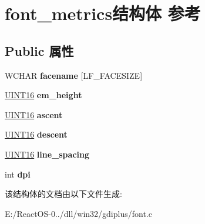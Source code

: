 \hypertarget{structfont__metrics}{}\section{font\+\_\+metrics结构体 参考}
\label{structfont__metrics}
\subsection*{Public 属性}
\begin{DoxyCompactItemize}
\item 
\mbox{\label{structfont__metrics_abbb6db4876b4f1fd09c288479f6adfc1}} 
W\+C\+H\+AR {\bfseries facename} \mbox{[}L\+F\+\_\+\+F\+A\+C\+E\+S\+I\+ZE\mbox{]}
\item 
\mbox{\label{structfont__metrics_a4f29cfd5a0ff6f2d4a1b8b5e36f22c2e}} 
\hyperlink{_processor_bind_8h_a09f1a1fb2293e33483cc8d44aefb1eb1}{U\+I\+N\+T16} {\bfseries em\+\_\+height}
\item 
\mbox{\label{structfont__metrics_a5e860c924043866358747543e44a4b1f}} 
\hyperlink{_processor_bind_8h_a09f1a1fb2293e33483cc8d44aefb1eb1}{U\+I\+N\+T16} {\bfseries ascent}
\item 
\mbox{\label{structfont__metrics_a9bac77e01c8aff587dbf0b6358f707ba}} 
\hyperlink{_processor_bind_8h_a09f1a1fb2293e33483cc8d44aefb1eb1}{U\+I\+N\+T16} {\bfseries descent}
\item 
\mbox{\label{structfont__metrics_a62dc6c21623d998cd6959312531a7c62}} 
\hyperlink{_processor_bind_8h_a09f1a1fb2293e33483cc8d44aefb1eb1}{U\+I\+N\+T16} {\bfseries line\+\_\+spacing}
\item 
\mbox{\label{structfont__metrics_a34915aa1556cb47aac6230280dc8b6f4}} 
int {\bfseries dpi}
\end{DoxyCompactItemize}


该结构体的文档由以下文件生成\+:\begin{DoxyCompactItemize}
\item 
E\+:/\+React\+O\+S-\/0../dll/win32/gdiplus/font.\+c\end{DoxyCompactItemize}
